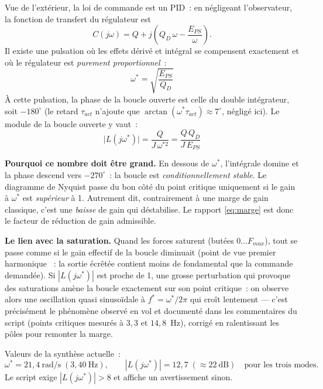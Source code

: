 \documentclass[a4paper,11pt]{article}
\begin{document}
Vue de l'extérieur, la loi de commande est un PID~: en négligeant
l'observateur, la fonction de transfert du régulateur est
\begin{equation}
    C(j\omega) = Q + j\left(Q_D\,\omega - \frac{E_{PS}}{\omega}\right).
\end{equation}
Il existe une pulsation où les effets dérivé et intégral se compensent
exactement et où le régulateur est \emph{purement proportionnel}~:
\begin{equation}
    \boxed{\;\omega^{*} = \sqrt{\frac{E_{PS}}{Q_D}}\;}
\end{equation}
À cette pulsation, la phase de la boucle ouverte est celle du double
intégrateur, soit $-180^\circ$ (le retard $\tau_{act}$ n'ajoute que
$\arctan(\omega^*\tau_{act}) \approx 7^\circ$, négligé ici). Le module de la
boucle ouverte y vaut~:
\begin{equation}
    \boxed{\;\big|L(j\omega^{*})\big| = \frac{Q}{J\,\omega^{*2}}
    = \frac{Q\,Q_D}{J\,E_{PS}}\;}
    \label{eq:marge}
\end{equation}

\textbf{Pourquoi ce nombre doit être grand.} En dessous de $\omega^{*}$,
l'intégrale domine et la phase descend vers $-270^\circ$~: la boucle est
\emph{conditionnellement stable}. Le diagramme de Nyquist passe du bon côté du
point critique uniquement si le gain à $\omega^{*}$ est \emph{supérieur} à 1.
Autrement dit, contrairement à une marge de gain classique, c'est une
\emph{baisse} de gain qui déstabilise. Le rapport \eqref{eq:marge} est donc le
facteur de réduction de gain admissible.

\textbf{Le lien avec la saturation.} Quand les forces saturent (butées
$0 \ldots F_{max}$), tout se passe comme si le gain effectif de la boucle
diminuait (point de vue \og premier harmonique \fg~: la sortie écrêtée
contient moins de fondamental que la commande demandée). Si
$|L(j\omega^{*})|$ est proche de 1, une grosse perturbation qui provoque des
saturations amène la boucle exactement sur son point critique~: on observe
alors une oscillation quasi sinusoïdale à $f^{*} = \omega^{*}/2\pi$ qui
croît lentement --- c'est précisément le phénomène observé en vol et documenté
dans les commentaires du script (points critiques mesurés à $3{,}3$ et
$14{,}8$~Hz), corrigé en ralentissant les pôles pour remonter la marge.

Valeurs de la synthèse actuelle~:
\begin{equation}
    \omega^{*} = 21{,}4\ \text{rad/s} \;(3{,}40\ \text{Hz}),
    \qquad
    |L(j\omega^{*})| = 12{,}7 \;(\approx 22\ \text{dB})
    \quad\text{pour les trois modes.}
\end{equation}
Le script exige $|L(j\omega^{*})| > 8$ et affiche un avertissement sinon.
\end{document}
